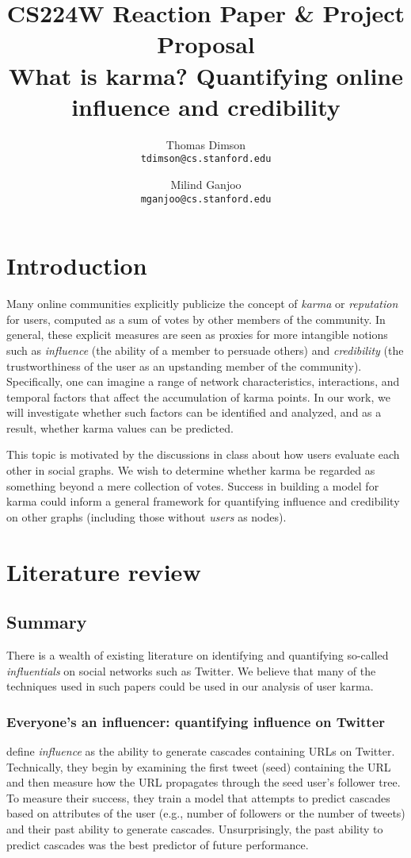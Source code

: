 \documentclass[10pt]{article}
\title{
  {\large CS224W Reaction Paper \& Project Proposal} \\
  What is karma? Quantifying online influence and credibility
}
\author{
  Thomas Dimson \\ {\tt tdimson@cs.stanford.edu}
  \and
  Milind Ganjoo \\ {\tt mganjoo@cs.stanford.edu}
}
\date{}
\begin{document}
\maketitle

\section{Introduction}
Many online communities explicitly publicize the concept
of \textit{karma} or \textit{reputation} for users, computed as a sum of votes
by other members of the community. In general, these explicit measures are seen
as proxies for more intangible notions such as \textit{influence} (the ability
of a member to persuade others) and \textit{credibility} (the trustworthiness
of the user as an upstanding member of the community). Specifically, one can 
imagine a range of network
characteristics, interactions, and temporal factors that affect the
accumulation of karma points. In our work, we will investigate whether such
factors can be identified and analyzed, and as a result, whether
karma values can be predicted.

This topic is motivated by the discussions in class about how users evaluate
each other in social graphs. We wish to determine whether karma be regarded
as something beyond a mere collection of votes. Success in building a model for
karma could inform a general framework for quantifying influence and credibility
on other graphs (including those without \textit{users} as nodes).

\section{Literature review}

\subsection{Summary}
There is a wealth of existing literature on identifying and quantifying
so-called \textit{influentials} on social networks such as Twitter. We believe
that many of the techniques used in such papers could be used in our analysis of
user karma.

\subsubsection{Everyone's an influencer: quantifying influence on Twitter \citep{bakshy2011everyone}}

\citet{bakshy2011everyone} define \textit{influence} as the ability to generate
cascades containing URLs on Twitter. Technically, they begin by examining the
first tweet (seed) containing the URL and then measure how the URL propagates
through the seed user's follower tree. To measure their success, they train a
model that attempts to predict cascades based on attributes of the user (e.g.,
number of followers or the number of tweets) and their past ability to generate
cascades.  Unsurprisingly, the past ability to predict cascades was the best
predictor of future performance.
\end{document}
